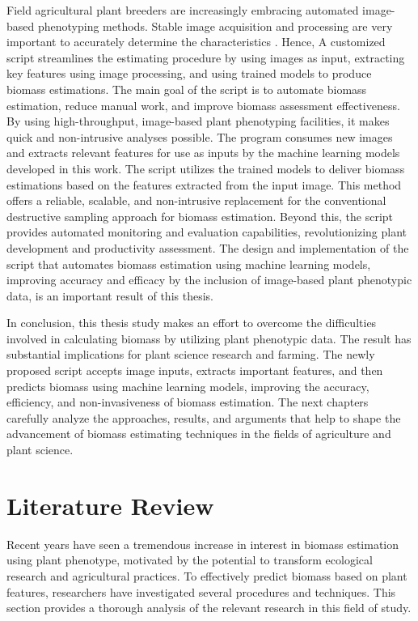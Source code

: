 \documentclass[a4paper,12pt]{report}%
\renewcommand{\\}{\vspace*{0.5\baselineskip} \newline}
\begin{document}
\noindent Field agricultural plant breeders are increasingly embracing automated image-based phenotyping methods. Stable image acquisition and processing are very important to accurately determine the characteristics \cite{8}. Hence, A customized script streamlines the estimating procedure by using images as input, extracting key features using image processing, and using trained models to produce biomass estimations. The main goal of the script is to automate biomass estimation, reduce manual work, and improve biomass assessment effectiveness. By using high-throughput, image-based plant phenotyping facilities, it makes quick and non-intrusive analyses possible. The program consumes new images and extracts relevant features for use as inputs by the machine learning models developed in this work.
The script utilizes the trained models to deliver biomass estimations based on the features extracted from the input image. This method offers a reliable, scalable, and non-intrusive replacement for the conventional destructive sampling approach for biomass estimation. Beyond this, the script provides automated monitoring and evaluation capabilities, revolutionizing plant development and productivity assessment. The design and implementation of the script that automates biomass estimation using machine learning models, improving accuracy and efficacy by the inclusion of image-based plant phenotypic data, is an important result of this thesis.

\noindent In conclusion, this thesis study makes an effort to overcome the difficulties involved in calculating biomass by utilizing plant phenotypic data. The result has substantial implications for plant science research and farming. The newly proposed script accepts image inputs, extracts important features, and then predicts biomass using machine learning models, improving the accuracy, efficiency, and non-invasiveness of biomass estimation. The next chapters carefully analyze the approaches, results, and arguments that help to shape the advancement of biomass estimating techniques in the fields of agriculture and plant science.


\chapter{Literature Review}
Recent years have seen a tremendous increase in interest in biomass estimation using plant phenotype, motivated by the potential to transform ecological research and agricultural practices. To effectively predict biomass based on plant features, researchers have investigated several procedures and techniques. This section provides a thorough analysis of the relevant research in this field of study.
\end{document}
